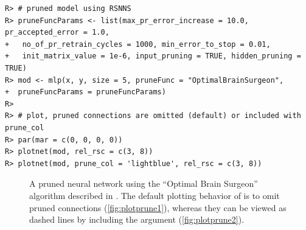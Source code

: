 \documentclass[article,shortnames]{jss}\usepackage[]{graphicx}\usepackage[]{color}
\makeatletter
\newenvironment{kframe}{%
 \def\at@end@of@kframe{}%
 \ifinner\ifhmode%
  \def\at@end@of@kframe{\end{minipage}}%
  \begin{minipage}{\columnwidth}%
 \fi\fi%
 \def\FrameCommand##1{\hskip\@totalleftmargin \hskip-\fboxsep
 \colorbox{shadecolor}{##1}\hskip-\fboxsep
     \hskip-\linewidth \hskip-\@totalleftmargin \hskip\columnwidth}%
 \MakeFramed {\advance\hsize-\width
   \@totalleftmargin\z@ \linewidth\hsize
   \@setminipage}}%
 {\par\unskip\endMakeFramed%
 \at@end@of@kframe}
\newenvironment{knitrout}{}{} %
\makeatother
\begin{document}
\begin{knitrout}
\color{fgcolor}\begin{kframe}
\begin{verbatim}
R> # pruned model using RSNNS
R> pruneFuncParams <- list(max_pr_error_increase = 10.0, pr_accepted_error = 1.0,
+   no_of_pr_retrain_cycles = 1000, min_error_to_stop = 0.01, 
+   init_matrix_value = 1e-6, input_pruning = TRUE, hidden_pruning = TRUE)
R> mod <- mlp(x, y, size = 5, pruneFunc = "OptimalBrainSurgeon",
+  pruneFuncParams = pruneFuncParams)
R> 
R> # plot, pruned connections are omitted (default) or included with prune_col
R> par(mar = c(0, 0, 0, 0))
R> plotnet(mod, rel_rsc = c(3, 8))
R> plotnet(mod, prune_col = 'lightblue', rel_rsc = c(3, 8))
\end{verbatim}
\end{kframe}\begin{figure}[!ht]

{\centering {}

}

\caption{A pruned neural network using the ``Optimal Brain Surgeon'' algorithm described in \citet{Zell98}.  The default plotting behavior of  is to omit pruned connections (\ref{fig:plotprune1}), whereas they can be viewed as dashed lines by including the  argument (\ref{fig:plotprune2}).}\label{fig:plotprune}
\end{figure}


\end{knitrout}
\end{document}
